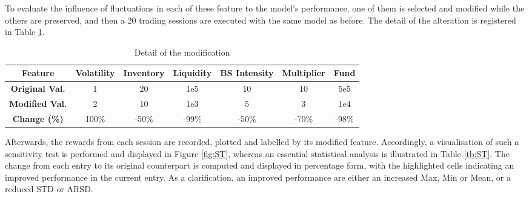 \documentclass[11pt,twoside]{article}
\numberwithin{Theorem}{section}
\numberwithin{Definition}{section}
\numberwithin{Lemma}{section}
\numberwithin{Algorithm}{section}
\numberwithin{equation}{section}
\begin{document}
To evaluate the influence of fluctuations in each of these feature to the model's performance, one of them is selected and modified while the others are preserved, and then a 20 trading sessions are executed with the same model as before. The detail of the alteration is registered in Table \ref{tb:mod}.

\begin{table}[ht]
\caption{Detail of the modification}
\label{tb:mod}
\begin{tabular}{|c|cccccc|}
\hline
\textbf{Feature} & \textbf{Volatility} & \textbf{Inventory} & \textbf{Liquidity} & \textbf{BS Intensity} & \textbf{Multiplier} & \textbf{Fund} \\ \hline
\textbf{Original Val.} & 1 & 20 & 1e5 & 10 & 10 & 5e5 \\
\textbf{Modified Val.} & 2 & 10 & 1e3 & 5 & 3 & 1e4 \\
\textbf{Change (\%)} & 100\% & -50\% & -99\% & -50\% & -70\% & -98\% \\ \hline
\end{tabular}
\end{table}

Afterwards, the rewards from each session are recorded, plotted and labelled by its modified feature. Accordingly, a visualisation of such a sensitivity test is performed and displayed in Figure \ref{fig:ST}, whereas an essential statistical analysis is illustrated in Table \ref{tb:ST}. The change from each entry to its original counterpart is computed and displayed in percentage form, with the highlighted cells indicating an improved performance in the current entry. As a clarification, an improved performance are either an increased Max, Min or Mean, or a reduced STD or ARSD.
\end{document}
